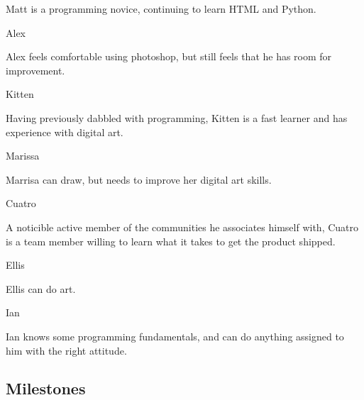 \documentclass[11pt]{article}
\begin{document}
Matt is a programming novice, continuing to learn HTML and Python.

{\large {\color{orange}Alex}}

Alex feels comfortable using photoshop, but still feels that he has room for improvement.

{\large {\color{orange}Kitten}}

Having previously dabbled with programming, Kitten is a fast learner and has experience with digital art.


{\large {\color{orange}Marissa}}

Marrisa can draw, but needs to improve her digital art skills.

{\large {\color{orange}Cuatro}}

A noticible active member of the communities he associates himself with, Cuatro is a team member willing to learn what it takes to get the product shipped.

{\large {\color{orange}Ellis}}

Ellis can do art.

{\large {\color{orange}Ian}}

Ian knows some programming fundamentals, and can do anything assigned to him with the right attitude.


\subsection{{\color{blue}Milestones}}
\end{document}
